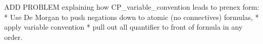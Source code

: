 \documentclass[handout]{mcs}
\begin{document}
\renewcommand{\reading}{
\begin{itemize}
 \item Chapter~\bref{prop_algebra_sec}{.\ \emph{The Algebra of Propositions}}
  through~\bref{SAT_sec},
\item Chapter~\bref{predicate_sec}{.\ \emph{Predicate Formulas}}.
\end{itemize}}








\begin{staffnotes}
ADD PROBLEM explaining how CP\_variable\_convention leads to prenex
form:
* Use De Morgan to push negations down to atomic (no connectives) formulas,
* apply variable convention
* pull out all quantifier to front of formula in any order.
\end{staffnotes}






\end{document}
